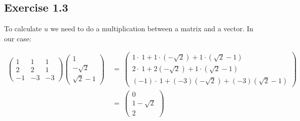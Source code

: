 \documentclass{article}
\begin{document}
\subsection*{Exercise 1.3}
To calculate $u$ we need to do a multiplication between a matrix and a vector. In our case:

\begin{align*}
  \begin{pmatrix}1&1&1\\ 2&2&1\\ -1&-3&-3\end{pmatrix}\begin{pmatrix}1\\ -\sqrt{2}\\ \sqrt{2}-1\end{pmatrix}~& = ~\begin{pmatrix}1\cdot \:1+1\cdot \left(-\sqrt{2}\right)+1\cdot \left(\sqrt{2}-1\right)\\ 2\cdot \:1+2\left(-\sqrt{2}\right)+1\cdot \left(\sqrt{2}-1\right)\\ \left(-1\right)\cdot \:1+\left(-3\right)\left(-\sqrt{2}\right)+\left(-3\right)\left(\sqrt{2}-1\right)\end{pmatrix} \\
  ~& = ~\begin{pmatrix}0\\ 1-\sqrt{2}\\ 2\end{pmatrix}
\end{align*}
\end{document}
